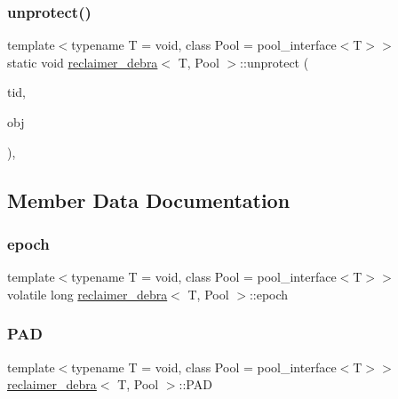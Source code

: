 \subsubsection{\texorpdfstring{unprotect()}{unprotect()}}
{\footnotesize\ttfamily template$<$typename T  = void, class Pool  = pool\+\_\+interface$<$\+T$>$$>$ \\
static void \hyperlink{classreclaimer__debra}{reclaimer\+\_\+debra}$<$ T, Pool $>$\+::unprotect (\begin{DoxyParamCaption}\item[{const int}]{tid,  }\item[{T $\ast$const}]{obj }\end{DoxyParamCaption})\hspace{0.3cm}{\ttfamily [inline]}, {\ttfamily [static]}}



\subsection{Member Data Documentation}
\mbox{\label{classreclaimer__debra_a5d09e238ce1873d0a812fc65c2fe46aa}} 
\subsubsection{\texorpdfstring{epoch}{epoch}}
{\footnotesize\ttfamily template$<$typename T  = void, class Pool  = pool\+\_\+interface$<$\+T$>$$>$ \\
volatile long \hyperlink{classreclaimer__debra}{reclaimer\+\_\+debra}$<$ T, Pool $>$\+::epoch\hspace{0.3cm}{\ttfamily [protected]}}

\mbox{\label{classreclaimer__debra_aabc191ce8b7b216157e1ab39f17f8471}} 
\subsubsection{\texorpdfstring{P\+AD}{PAD}}
{\footnotesize\ttfamily template$<$typename T  = void, class Pool  = pool\+\_\+interface$<$\+T$>$$>$ \\
\hyperlink{classreclaimer__debra}{reclaimer\+\_\+debra}$<$ T, Pool $>$\+::P\+AD\hspace{0.3cm}{\ttfamily [protected]}}

